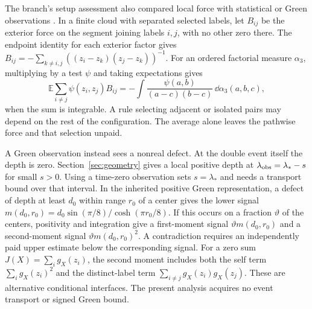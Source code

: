 The branch's setup assessment also compared local force with
statistical or Green observations \cite{OARecord}. In a finite cloud
with separated selected labels, let \(B_{ij}\) be the exterior
force on the segment joining labels \(i,j\), with no other zero
there. The endpoint identity for each exterior factor gives
\(B_{ij}=-\sum_{k\ne i,j}((z_i-z_k)(z_j-z_k))^{-1}\).
For an ordered factorial measure \(\alpha_3\), multiplying by a
test \(\psi\) and taking expectations gives
\[
 \mathbb E\sum_{i\ne j}\psi(z_i,z_j) B_{ij}
 =-\int\frac{\psi(a,b)}{(a-c)(b-c)}\,\dd\alpha_3(a,b,c),
\]
when the sum is integrable. A rule selecting adjacent or isolated
pairs may depend on the rest of the configuration. The average
alone leaves the pathwise force and that selection unpaid.

A Green observation instead sees a nonreal defect. At the double
event itself the depth is zero. Section~\ref{sec:geometry} gives a
local positive depth at \(\lambda_{\rm obs}=\lambda_*-s\) for
small \(s>0\). Using a time-zero observation sets \(s=\lambda_*\)
and needs a transport bound over that interval. In the inherited
positive Green representation, a defect of depth at least \(d_0\)
within range \(r_0\) of a center gives the lower signal
\(m(d_0,r_0)=d_0\sin(\pi/8)/\cosh(\pi r_0/8)\). If this occurs
on a fraction \(\vartheta\) of the centers, positivity and
integration give a first-moment signal \(\vartheta m(d_0,r_0)\)
and a second-moment signal \(\vartheta m(d_0,r_0)^2\).
A contradiction requires an independently paid upper estimate
below the corresponding signal. For a zero sum
\(J(X)=\sum_i g_X(z_i)\), the second moment includes both the
self term \(\sum_i g_X(z_i)^2\) and the distinct-label term
\(\sum_{i\ne j}g_X(z_i)g_X(z_j)\). These are alternative
conditional interfaces. The present analysis acquires no event
transport or signed Green bound.
